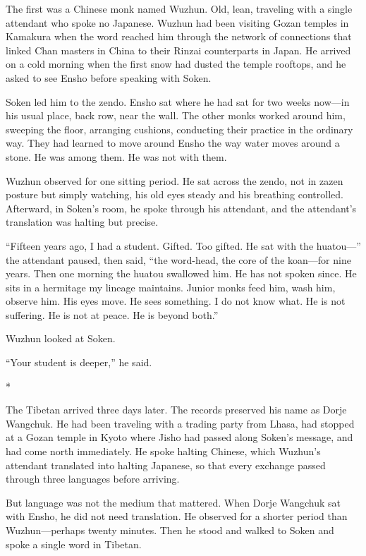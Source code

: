 The first was a Chinese monk named Wuzhun. Old, lean, traveling with a single attendant who spoke no Japanese. Wuzhun had been visiting Gozan temples in Kamakura when the word reached him through the network of connections that linked Chan masters in China to their Rinzai counterparts in Japan. He arrived on a cold morning when the first snow had dusted the temple rooftops, and he asked to see Ensho before speaking with Soken.

Soken led him to the zendo. Ensho sat where he had sat for two weeks now---in his usual place, back row, near the wall. The other monks worked around him, sweeping the floor, arranging cushions, conducting their practice in the ordinary way. They had learned to move around Ensho the way water moves around a stone. He was among them. He was not with them.

Wuzhun observed for one sitting period. He sat across the zendo, not in zazen posture but simply watching, his old eyes steady and his breathing controlled. Afterward, in Soken's room, he spoke through his attendant, and the attendant's translation was halting but precise.

``Fifteen years ago, I had a student. Gifted. Too gifted. He sat with the huatou---'' the attendant paused, then said, ``the word-head, the core of the koan---for nine years. Then one morning the huatou swallowed him. He has not spoken since. He sits in a hermitage my lineage maintains. Junior monks feed him, wash him, observe him. His eyes move. He sees something. I do not know what. He is not suffering. He is not at peace. He is beyond both.''

Wuzhun looked at Soken.

``Your student is deeper,'' he said.

\begin{center}
*\quad*\quad*
\end{center}

The Tibetan arrived three days later. The records preserved his name as Dorje Wangchuk. He had been traveling with a trading party from Lhasa, had stopped at a Gozan temple in Kyoto where Jisho had passed along Soken's message, and had come north immediately. He spoke halting Chinese, which Wuzhun's attendant translated into halting Japanese, so that every exchange passed through three languages before arriving.

But language was not the medium that mattered. When Dorje Wangchuk sat with Ensho, he did not need translation. He observed for a shorter period than Wuzhun---perhaps twenty minutes. Then he stood and walked to Soken and spoke a single word in Tibetan.

